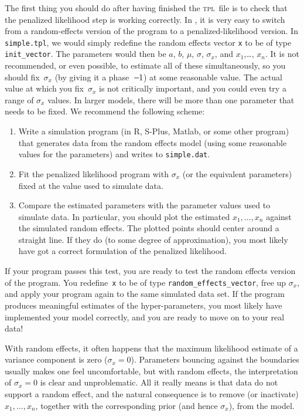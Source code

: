 \documentclass{admbmanual}
\begin{document}
The first thing you should do after having finished the \textsc{tpl}~file is to check that
the penalized likelihood step is working correctly. In \scAB, it is very easy to switch from a random-effects
version of the program to a penalized-likelihood version. In \texttt{simple.tpl}, we would simply redefine the
random effects vector \texttt{x} to be of type \texttt{init\_vector}. The parameters would then be $a$, $b$,
$\mu $, $\sigma $, $\sigma_{x}$, and $x_{1}$,\ldots , $x_{n}$. It is not recommended, or even possible, to estimate
all of these simultaneously, so you should fix~$\sigma_{x}$ (by giving it a phase~$-\kern-.1em1$) at some reasonable
value. The actual value at which you fix~$\sigma_{x}$ is not critically important, and you could even try a
range of $\sigma_{x}$ values. In larger models, there will be more than one parameter that needs to be fixed.
We recommend the following scheme:
\begin{enumerate}
\item Write a simulation program (in R, S-Plus, Matlab, or some other
program) that generates data from the random effects model (using some
reasonable values for the parameters) and writes to \texttt{simple.dat}.

\item Fit the penalized likelihood program with $\sigma_{x}$ (or the
equivalent parameters) fixed at the value used to simulate data.

\item Compare the estimated parameters with the parameter values used to
simulate data. In particular, you should plot the estimated $x_{1},\ldots,x_{n}$
against the simulated random effects. The plotted points should center
around a straight line. If they do (to some degree of approximation), you
most likely have got a correct formulation of the penalized likelihood.
\end{enumerate}
If your program passes this test, you are ready to test the random effects version of the program. You redefine~\texttt{x} to be of type \texttt{random\_effects\_vector}, free up $\sigma_{x}$, and apply your program again to
the same simulated data set. If the program produces meaningful estimates of the hyper-parameters, you most
likely have implemented your model correctly, and you are ready to move on to your real data!

With random effects, it often happens that the maximum likelihood estimate of
a variance component is zero ($\sigma_{x}=0$). Parameters bouncing
against the boundaries usually makes one feel uncomfortable, but with random
effects, the interpretation of $\sigma_{x}=0$ is clear and unproblematic. All
it really means is that data do not support a random effect, and the natural
consequence is to remove (or inactivate) $x_{1},\ldots ,x_{n}$, together
with the corresponding prior (and hence $\sigma_{x}$), from the model.
\end{document}

